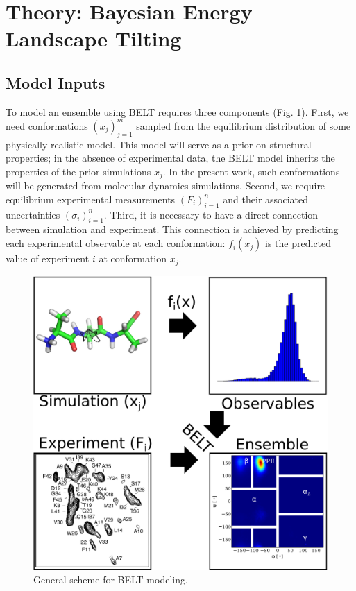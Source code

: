 \documentclass[11pt,titlepage]{article}
\begin{document}
\section*{Theory: Bayesian Energy Landscape Tilting}

\subsection*{Model Inputs}

To model an ensemble using BELT requires three components (Fig. \ref{figure:BELT}).  First, we need conformations $(x_j)_{j=1}^{m}$ sampled from the equilibrium distribution of some physically realistic model.  This model will serve as a prior on structural properties; in the absence of experimental data, the BELT model inherits the properties of the prior simulations $x_j$.  In the present work, such conformations will be generated from molecular dynamics simulations.  Second, we require equilibrium experimental measurements $(F_i)_{i=1}^n$ and their associated uncertainties $(\sigma_i)_{i=1}^{n}$.  Third, it is necessary to have a direct connection between simulation and experiment.  This connection is achieved by predicting each experimental observable at each conformation: $f_i(x_j)$ is the predicted value of experiment $i$ at conformation $x_j$.  

\begin{figure}

\includegraphics[width=16.0cm]{figures/info_graphic/info_graphic.png}

\caption{
General scheme for BELT modeling.
}
\label{figure:BELT}
\end{figure}
\end{document}
